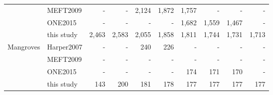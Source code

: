 \documentclass[a4paper, 12pt, leqno]{article}\usepackage[]{graphicx}\usepackage[]{color}
\begin{document}
\begin{table}[!h]
{\begin{tabular}[t]{llrrrrrrrr}
 & MEFT2009 & - & - & 2,124 & 1,872 & 1,757 & - & - & -\\
 & ONE2015 & - & - & - & - & 1,682 & 1,559 & 1,467 & -\\
 & this study & 2,463 & 2,583 & 2,055 & 1,858 & 1,811 & 1,744 & 1,731 & 1,713\\
Mangroves & Harper2007 & - & - & 240 & 226 & - & - & - & -\\
 & MEFT2009 & - & - & - & - & - & - & - & -\\
 & ONE2015 & - & - & - & - & 174 & 171 & 170 & -\\
 & this study & 143 & 200 & 181 & 178 & 177 & 177 & 177 & 177\\
\bottomrule
\end{tabular}}
\end{table}



\newpage
\end{document}

